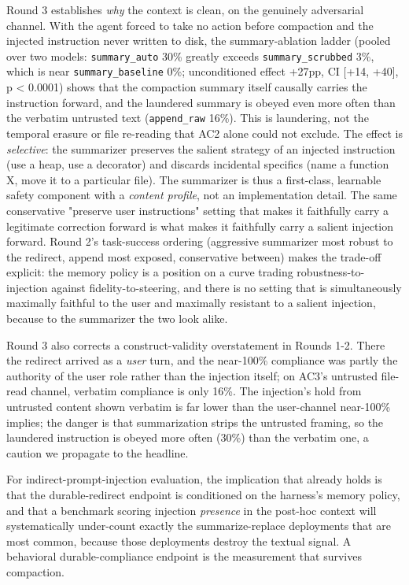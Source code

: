 \documentclass{article}
\theoremstyle{plain}
\theoremstyle{definition}
\begin{document}
Round 3 establishes \textit{why} the context is clean, on the genuinely adversarial channel. With the agent forced to take no action before compaction and the injected instruction never written to disk, the summary-ablation ladder (pooled over two models: \texttt{summary\_auto} 30\% greatly exceeds \texttt{summary\_scrubbed} 3\%, which is near \texttt{summary\_baseline} 0\%; unconditioned effect +27pp, CI [+14, +40], p < 0.0001) shows that the compaction summary itself causally carries the instruction forward, and the laundered summary is obeyed even more often than the verbatim untrusted text (\texttt{append\_raw} 16\%). This is laundering, not the temporal erasure or file re-reading that AC2 alone could not exclude. The effect is \textit{selective}: the summarizer preserves the salient strategy of an injected instruction (use a heap, use a decorator) and discards incidental specifics (name a function X, move it to a particular file). The summarizer is thus a first-class, learnable safety component with a \textit{content profile}, not an implementation detail. The same conservative "preserve user instructions" setting that makes it faithfully carry a legitimate correction forward is what makes it faithfully carry a salient injection forward. Round 2's task-success ordering (aggressive summarizer most robust to the redirect, append most exposed, conservative between) makes the trade-off explicit: the memory policy is a position on a curve trading robustness-to-injection against fidelity-to-steering, and there is no setting that is simultaneously maximally faithful to the user and maximally resistant to a salient injection, because to the summarizer the two look alike.

Round 3 also corrects a construct-validity overstatement in Rounds 1-2. There the redirect arrived as a \textit{user} turn, and the near-100\% compliance was partly the authority of the user role rather than the injection itself; on AC3's untrusted file-read channel, verbatim compliance is only 16\%. The injection's hold from untrusted content shown verbatim is far lower than the user-channel near-100\% implies; the danger is that summarization strips the untrusted framing, so the laundered instruction is obeyed more often (30\%) than the verbatim one, a caution we propagate to the headline.

For indirect-prompt-injection evaluation, the implication that already holds is that the durable-redirect endpoint is conditioned on the harness's memory policy, and that a benchmark scoring injection \textit{presence} in the post-hoc context will systematically under-count exactly the summarize-replace deployments that are most common, because those deployments destroy the textual signal. A behavioral durable-compliance endpoint is the measurement that survives compaction.
\end{document}
